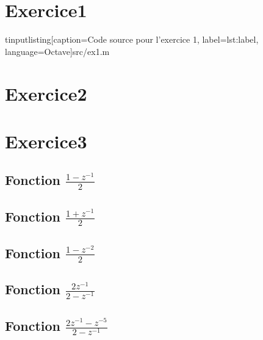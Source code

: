 \section{Exercice1}
tinputlisting[caption={Code source pour l'exercice 1}, label=lst:label, language=Octave]{src/ex1.m}
\section{Exercice2}

\section{Exercice3}
\subsection{Fonction $\frac{1-z^{-1}}{2}$}


\subsection{Fonction $\frac{1+z^{-1}}{2}$}


\subsection{Fonction $\frac{1-z^{-2}}{2}$}


\subsection{Fonction $\frac{2z^{-1}}{2-z^{-1}}$}


\subsection{Fonction $\frac{2z^{-1}-z^{-5}}{2-z^{-1}}$}


